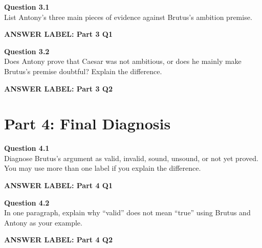 \documentclass[12pt]{article}
\newcommand{\answerbox}[2]{%
\vspace{0.12em}
\noindent\textbf{#1}\par
\vspace{0.04em}
\noindent\fbox{%
\begin{minipage}[t][#2]{\dimexpr\textwidth-2\fboxsep-2\fboxrule}
\rule{\textwidth}{0pt}
\vspace{#2}
\end{minipage}}
\par\vspace{0.22em}}
\begin{document}
\textbf{Question 3.1}\\[-0.15em]
List Antony's three main pieces of evidence against Brutus's ambition premise.

\answerbox{ANSWER LABEL: Part 3 Q1}{2.15in}

\textbf{Question 3.2}\\[-0.15em]
Does Antony prove that Caesar was not ambitious, or does he mainly make Brutus's premise doubtful? Explain the difference.

\answerbox{ANSWER LABEL: Part 3 Q2}{2.55in}

\newpage

\section*{Part 4: Final Diagnosis}

\textbf{Question 4.1}\\[-0.15em]
Diagnose Brutus's argument as valid, invalid, sound, unsound, or not yet proved. You may use more than one label if you explain the difference.

\answerbox{ANSWER LABEL: Part 4 Q1}{2.55in}

\textbf{Question 4.2}\\[-0.15em]
In one paragraph, explain why ``valid'' does not mean ``true'' using Brutus and Antony as your example.

\answerbox{ANSWER LABEL: Part 4 Q2}{2.45in}
\end{document}
